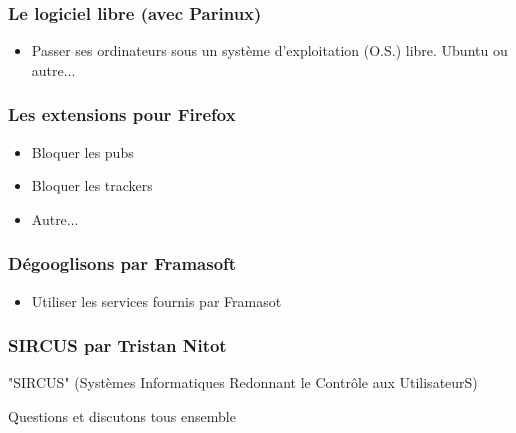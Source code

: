\documentclass{beamer}
\begin{document}
\begin{frame}
\frametitle{Le logiciel libre (avec Parinux)}
\begin{itemize}
\item Passer ses ordinateurs sous un système d'exploitation (O.S.) libre. Ubuntu ou autre...
\end{itemize}
\end{frame}

\begin{frame}
\frametitle{Les extensions pour Firefox}
\begin{itemize}
\item Bloquer les pubs
\item Bloquer les trackers
\item Autre...
\end{itemize}
\end{frame}
\begin{frame}
\frametitle{Dégooglisons par Framasoft}
\begin{itemize}
\item Utiliser les services fournis par Framasot
\end{itemize}
\end{frame}

\begin{frame}
\frametitle{SIRCUS par Tristan Nitot}
"SIRCUS" (Systèmes Informatiques Redonnant le Contrôle aux UtilisateurS)
\end{frame}

\begin{frame}
\begin{center}
\Huge{Questions et discutons tous ensemble}
\end{center}
\end{frame}
\end{document}
